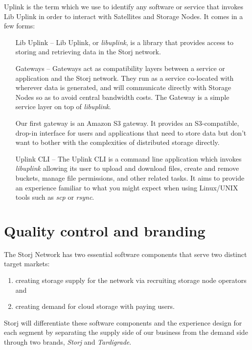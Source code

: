 \documentclass[8pt,fleqn,openany]{book}
\begin{document}
Uplink is the term which we use to identify any software or service that invokes Lib Uplink in order to interact with Satellites and Storage Nodes. It comes
in a few forms:

\begin{itemize}
\item[Lib Uplink] -- Lib Uplink, or {\em libuplink}, is a library that
  provides access to storing and retrieving data in the Storj network.

\item[Gateways] -- Gateways act as compatibility layers between a service or
  application and the Storj network.
  They run as a service co-located with wherever data is generated, and will
  communicate directly with Storage Nodes so as to avoid central bandwidth
  costs.
  The Gateway is a simple service layer on top of {\em libuplink}.

  Our first gateway is an Amazon S3 gateway. It provides an S3-compatible,
  drop-in interface for users and applications that need to store data but
  don't want to bother with the complexities of distributed storage directly.

\item[Uplink CLI] -- The Uplink CLI is a command line application which
  invokes {\em libuplink} allowing its user to upload and download files,
  create and remove buckets, manage file permissions, and other related tasks.
  It aims to provide an experience familiar to what you might expect when
  using Linux/UNIX tools such as {\em scp} or {\em rsync}.
\end{itemize}

\section{Quality control and branding}\label{sec:qc}

The Storj Network has two essential software components that serve two distinct
target markets:

\begin{enumerate}
\item creating storage supply for the network via recruiting storage node
  operators and
\item creating demand for cloud storage with paying users.
\end{enumerate}

Storj will differentiate these software components and the experience design
for each segment by separating the supply side of our business from the
demand side through two brands, {\em Storj} and {\em Tardigrade}.
\end{document}
